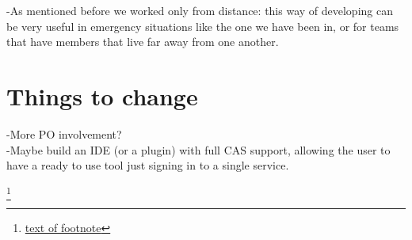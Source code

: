 \documentclass[a4paper,12pt]{report}
\begin{document}
-As mentioned before we worked only from distance: this way of developing can be very useful in emergency situations like the one we have been in, or for teams that have members that live far away from one another.\\
\section{Things to change}
-More PO involvement?\\
-Maybe build an IDE (or a plugin) with full CAS support, allowing the user to have a ready to use tool just signing in to a single service.



















\footnote{\href{insert link here}{text of footnote}}





\begin{abstract}
\end{abstract}
\end{document}
